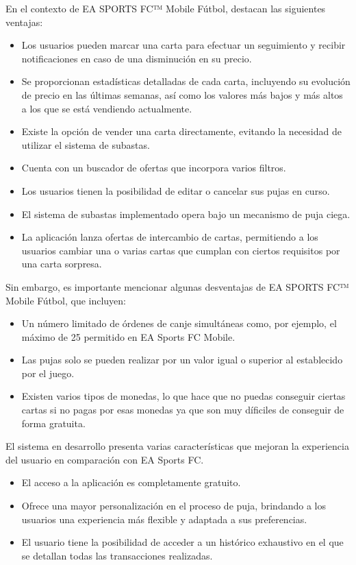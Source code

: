En el contexto de EA SPORTS FC™ Mobile Fútbol, destacan las siguientes ventajas:
\begin{itemize}
    \item Los usuarios pueden marcar una carta para efectuar un seguimiento y recibir notificaciones en caso de una disminución en su precio.
    \item Se proporcionan estadísticas detalladas de cada carta, incluyendo su evolución de precio en las últimas semanas, así como los valores más bajos y más altos a los que se está vendiendo actualmente.
    \item Existe la opción de vender una carta directamente, evitando la necesidad de utilizar el sistema de subastas. 
    \item Cuenta con un buscador de ofertas que incorpora varios filtros.
    \item Los usuarios tienen la posibilidad de editar o cancelar sus pujas en curso.
    \item El sistema de subastas implementado opera bajo un mecanismo de puja ciega.
    \item La aplicación lanza ofertas de intercambio de cartas, permitiendo a los usuarios cambiar una o varias cartas que cumplan con ciertos requisitos por una carta sorpresa.
\end{itemize}

Sin embargo, es importante mencionar algunas desventajas de EA SPORTS FC™ Mobile Fútbol, que incluyen:
\begin{itemize}
    \item Un número limitado de órdenes de canje simultáneas como, por ejemplo, el máximo de 25 permitido en EA Sports FC Mobile.
    \item Las pujas solo se pueden realizar por un valor igual o superior al establecido por el juego. 
    \item Existen varios tipos de monedas, lo que hace que no puedas conseguir ciertas cartas si no pagas por esas monedas ya que son muy díficiles de conseguir de forma gratuita.
\end{itemize}

El sistema en desarrollo presenta varias características que mejoran la experiencia del usuario en comparación con EA Sports FC.

\begin{itemize}
    \item El acceso a la aplicación es completamente gratuito.
    \item Ofrece una mayor personalización en el proceso de puja, brindando a los usuarios una experiencia más flexible y adaptada a sus preferencias.
    \item El usuario tiene la posibilidad de acceder a un histórico exhaustivo en el que se detallan todas las transacciones realizadas.
\end{itemize}

